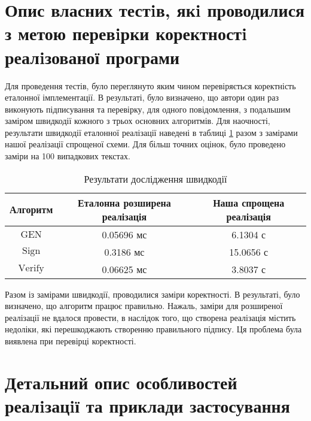 \documentclass[12pt]{HomusWorkus}
\begin{document}

\section{Опис власних тестiв, якi проводилися з метою перевiрки коректностi реалiзованої програми}

Для проведення тестів, було переглянуто яким чином перевіряється коректність еталонної імплементації. В результаті, було визначено, що автори один раз виконують підписування та перевірку, для одного повідомлення, з подальшим заміром швидкодії кожного з трьох основних алгоритмів.
Для наочності, результати швидкодії еталонної реалізації наведені в таблиці \ref{tab:speeeeed} разом з замірами нашої реалізації спрощеної схеми. Для більш точних оцінок, було проведено заміри на 100 випадкових текстах. 

\begin{table}[ht]
    \centering
    \begin{tabular}{|c|c|c|}
        \hline
        Алгоритм & Еталонна розширена реалізація & Наша спрощена реалізація \\\hline
        $\mathrm{GEN}$ & 0.05696 мс & 6.1304 с \\\hline
        $\mathrm{Sign}$ & 0.3186 мс & 15.0656 с \\\hline
        $\mathrm{Verify}$ & 0.06625 мс & 3.8037 с \\\hline
        \hline
    \end{tabular}
    \caption{Результати дослідження швидкодії}
    \label{tab:speeeeed}
\end{table}

Разом із замірами швидкодії, проводилися заміри коректності. В результаті, було визначено, що алгоритм працює правильно.
Нажаль, заміри для розширеної реалізації не вдалося провести, в наслідок того, що створена реалізація містить недоліки, які перешкоджають створенню правильного підпису. Ця проблема була виявлена при перевірці коректності.


\section{Детальний опис особливостей реалiзацiї та приклади застосування}
\end{document}
